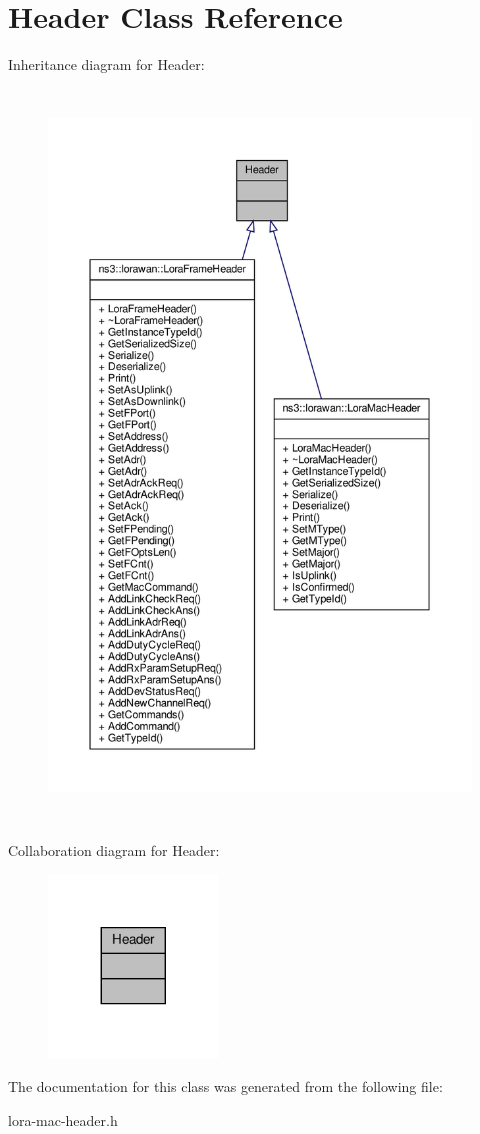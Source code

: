 \hypertarget{classHeader}{}\section{Header Class Reference}
\label{classHeader}


Inheritance diagram for Header\+:
\nopagebreak
\begin{figure}[H]
\begin{center}
\leavevmode
\includegraphics[height=550pt]{classHeader__inherit__graph}
\end{center}
\end{figure}


Collaboration diagram for Header\+:
\nopagebreak
\begin{figure}[H]
\begin{center}
\leavevmode
\includegraphics[width=128pt]{classHeader__coll__graph}
\end{center}
\end{figure}


The documentation for this class was generated from the following file\+:\begin{DoxyCompactItemize}
\item 
lora-\/mac-\/header.\+h\end{DoxyCompactItemize}

